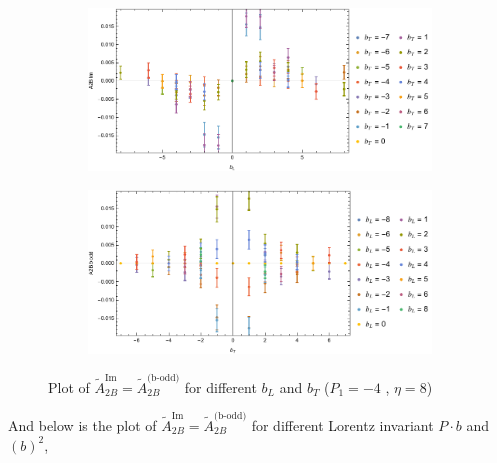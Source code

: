 \documentclass[]{article}
\numberwithin{equation}{section}
\newcommand{\tAmp}{\widetilde{A}}
\newcommand{\tAmp}{\ensuremath{\widetilde{A}^{(+)}}}
\begin{document}
\begin{figure}[h!]
     \centering
     \begin{subfigure}[b]{0.45\textwidth}
         \centering
         \includegraphics[width=\textwidth]{Amp_plots/bL_A2B_b_odd_P1_-4_eta_8.pdf}
     \end{subfigure}
     \begin{subfigure}[b]{0.45\textwidth}
         \centering
         \includegraphics[width=\textwidth]{Amp_plots/bT_A2B_b_odd_P1_-4_eta_8.pdf}
     \end{subfigure}
        \caption{Plot of  $\tAmp^{\text{Im}}_{2B}=\tAmp^{\text{(b-odd)}}_{2B}$ for different $b_{L}$ and $b_{T}$  ($P_{1} = -4$ , $\eta=8$)}
\end{figure}
\pagebreak
And below is the plot of $\tAmp^{\text{Im}}_{2B}=\tAmp^{\text{(b-odd)}}_{2B}$ for different Lorentz invariant $P\cdot b$ and $(b)^2$,
\end{document}
